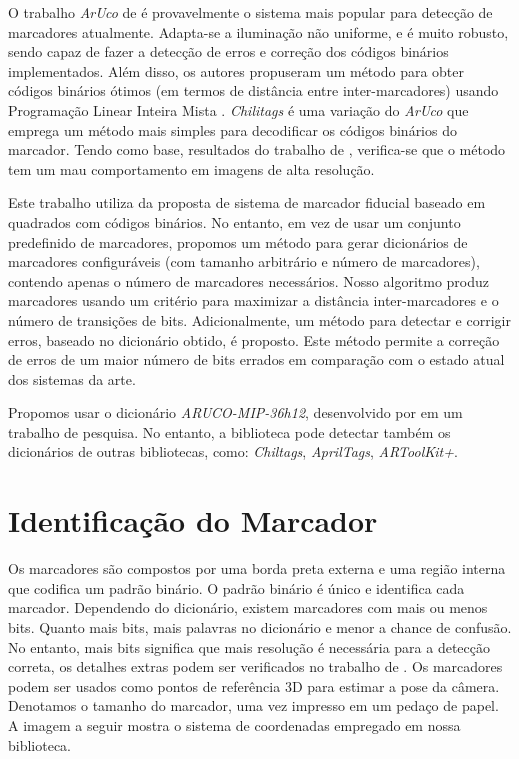 O trabalho \textit{ArUco} de \citet{Aruco2014} é provavelmente o sistema mais popular para detecção de marcadores atualmente. Adapta-se a iluminação não uniforme, e é muito robusto, sendo capaz de fazer a detecção de erros e correção dos códigos binários implementados. Além disso, os autores propuseram um método para obter códigos binários ótimos (em termos de distância entre inter-marcadores) usando Programação Linear Inteira Mista  \citet{Garrido2016}. \textit{Chilitags}  \citet{Bonnard2013} é uma variação do \textit{ArUco} que emprega um método mais simples para decodificar os códigos binários do marcador. Tendo como base, resultados do trabalho de \citet{Ramirez2018}, verifica-se que o método tem um mau comportamento em imagens de alta resolução.

Este trabalho utiliza da proposta de sistema de marcador fiducial baseado em quadrados com códigos binários. No entanto, em vez de usar um conjunto predefinido de marcadores, propomos um método para gerar dicionários de marcadores configuráveis (com tamanho arbitrário e número de marcadores), contendo apenas o número de marcadores necessários. Nosso algoritmo produz marcadores usando um critério para maximizar a distância inter-marcadores e o número de transições de bits. Adicionalmente, um método para detectar e corrigir erros, baseado no dicionário obtido, é proposto. Este método permite a correção de erros de um maior número de bits errados em comparação com o estado atual dos sistemas da arte.

Propomos usar o dicionário \textit{ARUCO-MIP-36h12}, desenvolvido por \cite{Garrido2016} em um trabalho de pesquisa. No entanto, a biblioteca pode detectar também os dicionários de outras bibliotecas, como: \textit{Chiltags}, \textit{AprilTags}, \textit{ARToolKit+}.

\section{Identificação do Marcador}

Os marcadores são compostos por uma borda preta externa e uma região interna que codifica um padrão binário. O padrão binário é único e identifica cada marcador. Dependendo do dicionário, existem marcadores com mais ou menos bits. Quanto mais bits, mais palavras no dicionário e menor a chance de confusão. No entanto, mais bits significa que mais resolução é necessária para a detecção correta, os detalhes extras podem ser verificados no trabalho de \citet{Garrido2016}. Os marcadores podem ser usados como pontos de referência 3D para estimar a pose da câmera. Denotamos o tamanho do marcador, uma vez impresso em um pedaço de papel. A imagem a seguir mostra o sistema de coordenadas empregado em nossa biblioteca.

